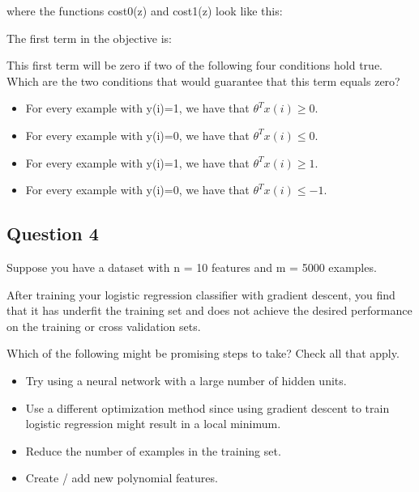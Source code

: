 \documentclass[11pt]{article} %
\begin{document}
where the functions cost0(z) and cost1(z) look like this:


The first term in the objective is:

This first term will be zero if two of the following four conditions hold true. Which are the two conditions that would guarantee that this term equals zero?

\begin{itemize}
\item For every example with y(i)=1, we have that $ \theta^T x(i)\geq 0$.

\item For every example with y(i)=0, we have that $ \theta^T x(i)\leq 0$.

\item For every example with y(i)=1, we have that $ \theta^T x(i)\geq 1$.

\item For every example with y(i)=0, we have that $ \theta^T x(i)\leq -1$.
\end{itemize}

\subsection*{Question 4}
Suppose you have a dataset with n = 10 features and m = 5000 examples.

After training your logistic regression classifier with gradient descent, you find that it has underfit the training set and does not achieve the desired performance on the training or cross validation sets.

Which of the following might be promising steps to take? Check all that apply.
\begin{itemize}
	\item Try using a neural network with a large number of hidden units.
	
	\item Use a different optimization method since using gradient descent to train logistic regression might result in a local minimum.
	
	\item Reduce the number of examples in the training set.
	
	\item Create / add new polynomial features.
\end{itemize}
\end{document}
